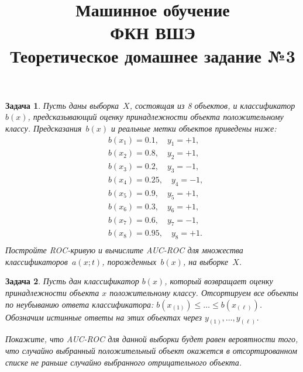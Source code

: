 \documentclass[12pt,fleqn]{article}
\newtheorem{esProblem}{Задача}
\begin{document}
\title{Машинное обучение\\ФКН ВШЭ\\Теоретическое домашнее задание №3}

\date{}

\author{}

\maketitle


\begin{esProblem}
		Пусть даны выборка~$X$, состоящая из 8 объектов, и классификатор~$b(x)$, предсказывающий оценку принадлежности объекта положительному классу. Предсказания~$b(x)$ и реальные метки объектов приведены ниже:
		\begin{align*}
			&b(x_1) = 0.1, \quad  y_1 = +1,\\
			&b(x_2) = 0.8, \quad y_2 = +1,\\
			&b(x_3) = 0.2, \quad y_3 = -1,\\
			&b(x_4) = 0.25, \quad y_4 = -1,\\
			&b(x_5) = 0.9, \quad y_5 = +1,\\
			&b(x_6) = 0.3, \quad y_6 = +1,\\
			&b(x_7) = 0.6, \quad y_7 = -1,\\
			&b(x_8) = 0.95, \quad y_8 = +1.\\
		\end{align*}
    Постройте ROC-кривую и вычислите AUC-ROC для множества классификаторов~$a(x;t)$, порожденных~$b(x)$, на выборке~$X$.

\end{esProblem}

\begin{esProblem}
	Пусть дан  классификатор $b(x)$, который возвращает оценку принадлежности объекта $x$ положительному классу. Отсортируем все объекты по неубыванию ответа классификатора: $b(x_{(1)}) \le \dots \le b(x_{(\ell)})$. Обозначим истинные ответы на этих объектах через $y_{(1)}, \dots, y_{(\ell)}$.
	
	Покажите, что AUC-ROC для данной выборки будет равен вероятности того, что случайно выбранный положительный объект окажется в отсортированном списке не раньше случайно выбранного отрицательного объекта.

\end{esProblem}
\end{document}

